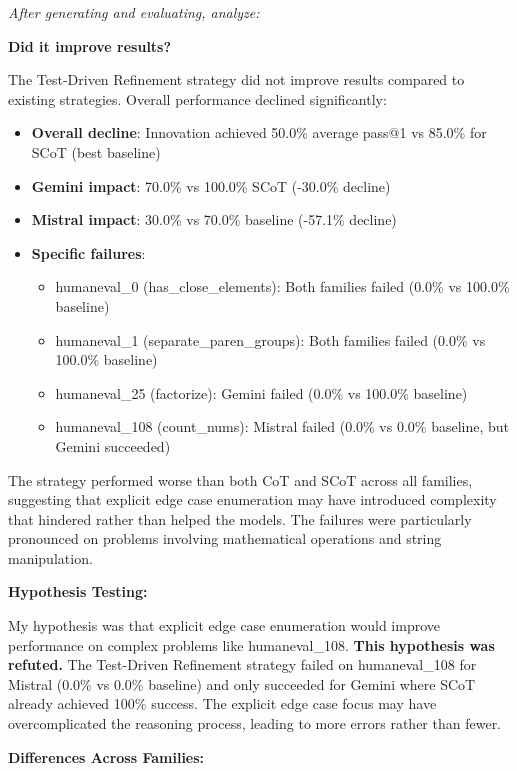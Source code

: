 \documentclass[11pt]{article}
\begin{document}
\textit{After generating and evaluating, analyze:}

\textbf{Did it improve results?}

The Test-Driven Refinement strategy did not improve results compared to existing strategies. Overall performance declined significantly:

\begin{itemize}
    \item \textbf{Overall decline}: Innovation achieved 50.0\% average pass@1 vs 85.0\% for SCoT (best baseline)
    \item \textbf{Gemini impact}: 70.0\% vs 100.0\% SCoT (-30.0\% decline)
    \item \textbf{Mistral impact}: 30.0\% vs 70.0\% baseline (-57.1\% decline)
    \item \textbf{Specific failures}: 
    \begin{itemize}
        \item humaneval\_0 (has\_close\_elements): Both families failed (0.0\% vs 100.0\% baseline)
        \item humaneval\_1 (separate\_paren\_groups): Both families failed (0.0\% vs 100.0\% baseline)
        \item humaneval\_25 (factorize): Gemini failed (0.0\% vs 100.0\% baseline)
        \item humaneval\_108 (count\_nums): Mistral failed (0.0\% vs 0.0\% baseline, but Gemini succeeded)
    \end{itemize}
\end{itemize}

The strategy performed worse than both CoT and SCoT across all families, suggesting that explicit edge case enumeration may have introduced complexity that hindered rather than helped the models. The failures were particularly pronounced on problems involving mathematical operations and string manipulation.

\textbf{Hypothesis Testing:}

My hypothesis was that explicit edge case enumeration would improve performance on complex problems like humaneval\_108. \textbf{This hypothesis was refuted.} The Test-Driven Refinement strategy failed on humaneval\_108 for Mistral (0.0\% vs 0.0\% baseline) and only succeeded for Gemini where SCoT already achieved 100\% success. The explicit edge case focus may have overcomplicated the reasoning process, leading to more errors rather than fewer.

\textbf{Differences Across Families:}
\end{document}
